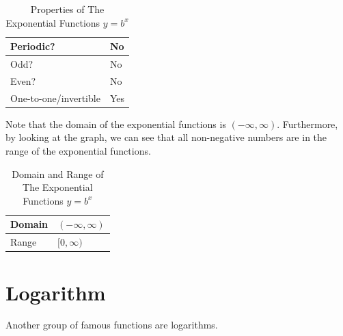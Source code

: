 \documentclass[nooutcomes]{ximera}
\begin{document}
\begin{center}  
\end{center}

\begin{table}[h]
\caption{\label{tab:expproperties}Properties of The Exponential Functions $y = b^{x}$}
\centering
\begin{tabular}{l|l}
Periodic? & No\\ \hline
Odd? &  No \\ \hline
Even? & No \\ \hline
One-to-one/invertible & Yes
\end{tabular}
\end{table}

Note that the domain of the exponential functions is $(-\infty, \infty)$. Furthermore, by looking at the graph, we can see that all non-negative numbers are in the range of the exponential functions.

\begin{table}[h]
\caption{\label{tab:expdr}Domain and Range of The Exponential Functions $y = b^x$}
\centering
\begin{tabular}{l|l}
Domain & $(-\infty, \infty)$ \\ \hline
Range & $[0, \infty)$
\end{tabular}
\end{table}


\newpage


\section{Logarithm}
Another group of famous functions are logarithms.
\end{document}
